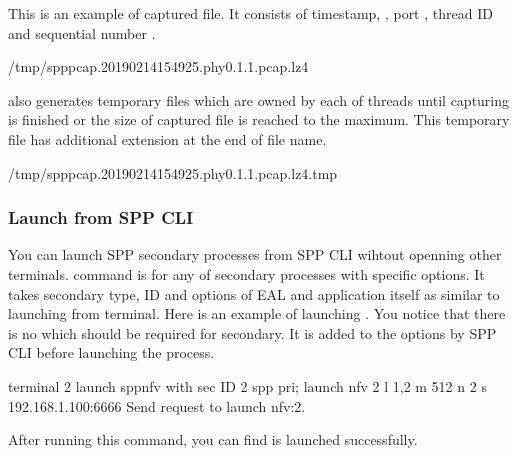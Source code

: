 \documentclass[a4paper,11pt,openany,oneside,english]{sphinxmanual}
\begin{document}
This is an example of captured file. It consists of timestamp,
, port , thread ID  and sequential number
.

\begin{sphinxVerbatim}[commandchars=\\\{\},formatcom=\footnotesize]
/tmp/spp\PYGZus{}pcap.20190214154925.phy0.1.1.pcap.lz4
\end{sphinxVerbatim}

 also generates temporary files which are owned by each of
 threads until capturing is finished or the size of captured file
is reached to the maximum.
This temporary file has additional extension  at the end of file
name.

\begin{sphinxVerbatim}[commandchars=\\\{\},formatcom=\footnotesize]
/tmp/spp\PYGZus{}pcap.20190214154925.phy0.1.1.pcap.lz4.tmp
\end{sphinxVerbatim}


\subsubsection{Launch from SPP CLI}
\label{\detokenize{gsg/howto_use:launch-from-spp-cli}}
You can launch SPP secondary processes from SPP CLI wihtout openning
other terminals.  command is for any of secondary processes
with specific options. It takes secondary type, ID and options of EAL
and application itself as similar to launching from terminal.
Here is an example of launching . You notice that there is no
 which should be required for secondary.
It is added to the options by SPP CLI before launching the process.

\begin{sphinxVerbatim}[commandchars=\\\{\},formatcom=\footnotesize]
\PYGZsh{} terminal 2
\PYGZsh{} launch spp\PYGZus{}nfv with sec ID 2
spp \PYGZgt{} pri; launch nfv 2 \PYGZhy{}l 1,2 \PYGZhy{}m 512 \PYGZhy{}\PYGZhy{} \PYGZhy{}n 2 \PYGZhy{}s 192.168.1.100:6666
Send request to launch nfv:2.
\end{sphinxVerbatim}

After running this command, you can find  is launched
successfully.
\end{document}
